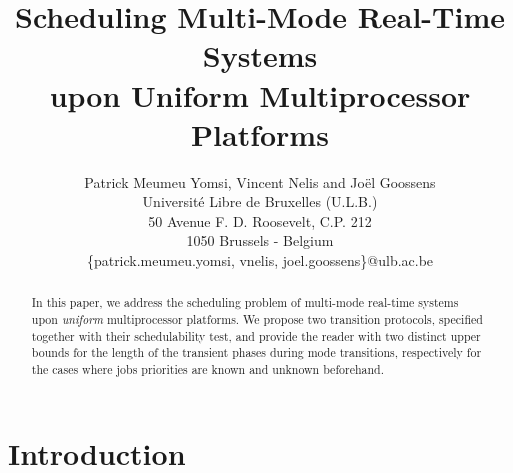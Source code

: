 \documentclass[10pt,english,a4paper]{article}
\newtheorem{validity test}{Validity Test}
\begin{document}
\title{Scheduling Multi-Mode Real-Time Systems \\ upon Uniform Multiprocessor Platforms}



\author{
	Patrick Meumeu Yomsi, Vincent Nelis and Jo\"{e}l Goossens\\
	Universit\'{e} Libre de Bruxelles (U.L.B.)\\
         50 Avenue F. D. Roosevelt, C.P. 212\\ 
	1050 Brussels - Belgium \\
	\{patrick.meumeu.yomsi, vnelis, joel.goossens\}@ulb.ac.be \\ 
}

\maketitle
\thispagestyle{empty}

\addtocounter{footnote}{2}
                                                                                                         


\begin{abstract}
In this paper, we address the scheduling problem of multi-mode real-time systems upon {\em uniform} multiprocessor platforms. We propose two transition protocols, specified together with their schedulability test, and provide the reader with two distinct upper bounds for the length of the transient phases during mode transitions, respectively for the cases where jobs priorities are known and unknown beforehand.
\end{abstract}

\vspace{-0.3cm}
\section{Introduction}\label{Introduction}
\end{document}
